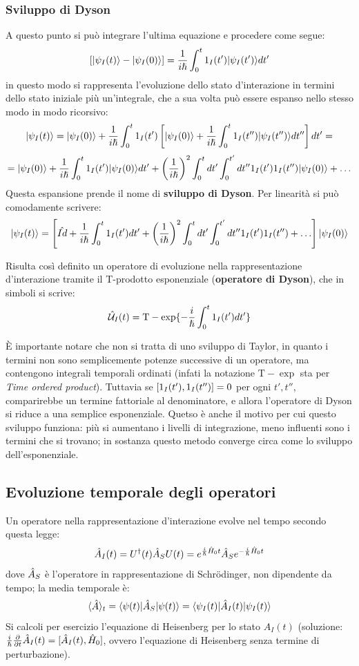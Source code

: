 \subsubsection*{Sviluppo di Dyson}
A questo punto si può integrare l'ultima equazione e procedere come segue:
\[
    \left[ \Ket {\psi_I(t)} - \Ket {\psi_I(0)} \right] = \frac{1}{i \hslash} \int_0^t \V_I(t') \Ket {\psi_I(t')} dt'
\]
in questo modo si rappresenta l'evoluzione dello stato d'interazione in termini dello stato iniziale più un'integrale, che a sua volta può essere espanso nello stesso modo in modo ricorsivo:
\[
    \Ket {\psi_I(t)} = \Ket {\psi_I(0)} + \frac{1}{i \hslash} \int_0^t \V_I(t') \left[ \Ket {\psi_I(0)} + \frac{1}{i \hslash} \int_0^t \V_I(t'') \Ket {\psi_I(t'')} dt'' \right] dt' =
\]
\[
    = \Ket {\psi_I(0)} + \frac{1}{i \hslash} \int_0^t \V_I(t') \Ket {\psi_I(0)} dt' + \left( \frac{1}{i \hslash} \right)^2 \int_0^t dt' \int_0^{t'} dt'' \V_I(t') \V_I(t'') \Ket {\psi_I(0)} + \ldots
\]
Questa espansione prende il nome di \textbf{sviluppo di Dyson}.
Per linearità si può comodamente scrivere:
\[
    \Ket {\psi_I(t)} = \left[ \hat {Id} + \frac{1}{i \hslash} \int_0^t \V_I(t') dt' + \left( \frac{1}{i \hslash} \right)^2 \int_0^t dt' \int_0^{t'} dt'' \V_I(t') \V_I(t'') + \ldots \right] \Ket {\psi_I(0)}
\]

Risulta così definito un operatore di evoluzione nella rappresentazione d'interazione tramite il T-prodotto esponenziale (\textbf{operatore di Dyson}), che in simboli si scrive:
\[
    \U_I(t) = \text{T} - \exp \{ -\frac{i}{\hslash} \int_0^t \V_I(t') dt' \}
\]

È importante notare che non si tratta di uno sviluppo di Taylor, in quanto i termini non sono semplicemente potenze successive di un operatore, ma contengono integrali temporali ordinati (infati la notazione $\text{T} - \exp$ sta per \textit{Time ordered product}). Tuttavia se $[\V_I(t'), \V_I(t'')] = 0$ per ogni $t', t''$, comparirebbe un termine fattoriale al denominatore, e allora l'operatore di Dyson si riduce a una semplice esponenziale. Quetso è anche il motivo per cui questo sviluppo funziona: più si aumentano i livelli di integrazione, meno influenti sono i termini che si trovano; in sostanza questo metodo converge circa come lo sviluppo dell'esponenziale.

\subsection{Evoluzione temporale degli operatori}
Un operatore nella rappresentazione d'interazione evolve nel tempo secondo questa legge:
\[
    \hat A_I(t) = U^\dagger(t) \hat A_S U(t) = e^{\frac{i}{\hslash} \H_0 t} \hat A_S e^{-\frac{i}{\hslash} \H_0 t}
\]
dove $\A_S$ è l'operatore in rappresentazione di Schrödinger, non dipendente da tempo; la media temporale è:
\[
    \avg[t]{\hat A} = \Bra{\psi(t)} \hat A_S \Ket{\psi(t)} = \Bra{\psi_I(t)} \hat A_I(t) \Ket{\psi_I(t)}
\]
Si calcoli per esercizio l'equazione di Heisenberg per lo stato $A_I(t)$ (soluzione: \( \frac{i}{\hslash} \tderiv{} \hat A_I(t) = [\hat A_I(t), \H_0] \), ovvero l'equazione di Heisenberg senza termine di perturbazione).



